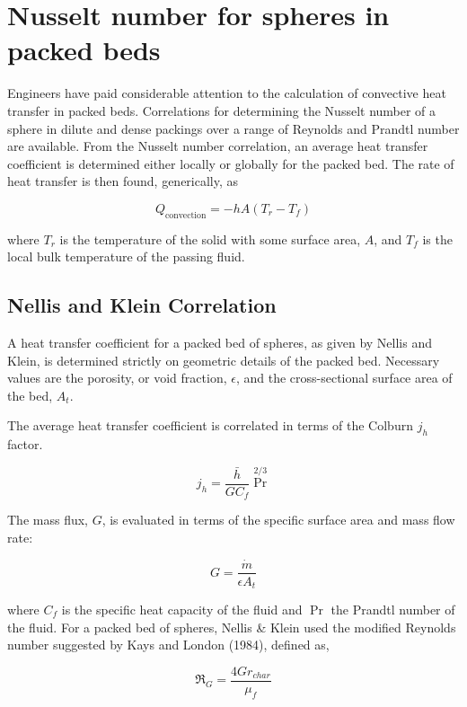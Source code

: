 \section{Nusselt number for spheres in packed beds}\label{sec:particle-convection}

Engineers have paid considerable attention to the calculation of convective heat transfer in packed beds. Correlations for determining the Nusselt number of a sphere in dilute and dense packings over a range of Reynolds and Prandtl number are available. From the Nusselt number correlation, an average heat transfer coefficient is determined either locally or globally for the packed bed. The rate of heat transfer is then found, generically, as

\begin{equation}
	Q_\text{convection} = -hA(T_r-T_f)
\end{equation}

where $T_r$ is the temperature of the solid with some surface area, $A$, and $T_f$ is the local bulk temperature of the passing fluid.

\subsection{Nellis and Klein Correlation}

A heat transfer coefficient for a packed bed of spheres, as given by Nellis and Klein, is determined strictly on geometric details of the packed bed.  Necessary values are the porosity, or void fraction, $\epsilon$, and the cross-sectional surface area of the bed, $A_t$.

The average heat transfer coefficient is correlated in terms of the Colburn $j_h$ factor.

\begin{equation}
	j_h=\frac{\bar{h}}{G C_f} \Pr^{2/3}
\end{equation}

The mass flux, $G$, is evaluated in terms of the specific surface area and mass flow rate:

\begin{equation}
	G=\frac{\dot{m}}{\epsilon A_t}
\end{equation}

where $C_f$ is the specific heat capacity of the fluid and $\Pr$ the Prandtl number of the fluid. For a packed bed of spheres, Nellis \& Klein used the modified Reynolds number suggested by Kays and London (1984), defined as,

\begin{equation}
	\Re_G=\frac{4 G r_{char}}{\mu_f}
\end{equation}

